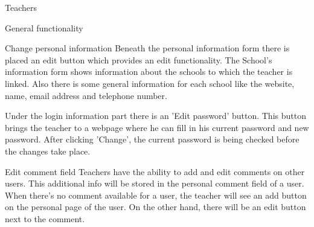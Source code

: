 \begin{section}{Teachers}
\begin{subsection}{General functionality}
\begin{subsubsection}{Change personal information}
            Beneath the personal information form there is placed an edit button
            which provides an edit functionality. The School's information form
            shows information about the schools to which the teacher is linked.
            Also there is some general information for each school like the
            website, name, email address and telephone number.

            Under the login information part there is an 'Edit password' button. 
            This button brings the teacher to a webpage where he can fill in his current password and new password. 
            After clicking 'Change', the current password is being checked before the changes take place.
        \end{subsubsection}
				
				\begin{subsubsection}{Edit comment field}
				Teachers have the ability to add and edit comments on other users. This additional info will be stored in the personal comment field of a user. When there's no comment available for a user, the teacher will see an add button on the personal page of the user. On the other hand, there will be an edit button next to the comment.
				\end{subsubsection}
				

\end{subsection}
\end{section}
